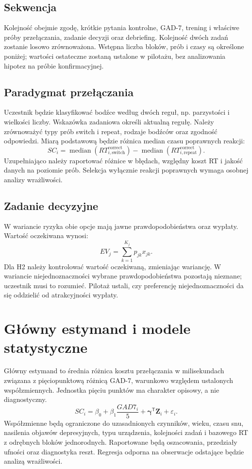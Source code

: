 \documentclass[11pt,a4paper]{article}
\begin{document}
\subsection{Sekwencja}
Kolejność obejmie zgodę, krótkie pytania kontrolne, GAD-7, trening i właściwe próby przełączania, zadanie decyzji oraz debriefing. Kolejność dwóch zadań zostanie losowo zrównoważona. Wstępna liczba bloków, prób i czasy są określone poniżej; wartości ostateczne zostaną ustalone w pilotażu, bez analizowania hipotez na próbie konfirmacyjnej.

\subsection{Paradygmat przełączania}
Uczestnik będzie klasyfikować bodźce według dwóch reguł, np. parzystości i wielkości liczby. Wskazówka zadaniowa określi aktualną regułę. Należy zrównoważyć typy prób switch i repeat, rodzaje bodźców oraz zgodność odpowiedzi. Miarą podstawową będzie różnica median czasu poprawnych reakcji:
\begin{equation}
SC_i=\operatorname{median}(RT^{\mathrm{correct}}_{i,\mathrm{switch}})
-\operatorname{median}(RT^{\mathrm{correct}}_{i,\mathrm{repeat}}).
\end{equation}
Uzupełniająco należy raportować różnice w błędach, względny koszt RT i jakość danych na poziomie prób. Selekcja wyłącznie reakcji poprawnych wymaga osobnej analizy wrażliwości.

\subsection{Zadanie decyzyjne}
W wariancie ryzyka obie opcje mają jawne prawdopodobieństwa oraz wypłaty. Wartość oczekiwana wynosi:
\begin{equation}
EV_j=\sum_{k=1}^{K_j}p_{jk}x_{jk}.
\end{equation}
Dla H2 należy kontrolować wartość oczekiwaną, zmieniając wariancję. W wariancie niejednoznaczności wybrane prawdopodobieństwa pozostają nieznane; uczestnik musi to rozumieć. Pilotaż ustali, czy preferencję niejednoznaczności da się oddzielić od atrakcyjności wypłaty.

\section{Główny estymand i modele statystyczne}
Główny estymand to średnia różnica kosztu przełączania w milisekundach związana z pięciopunktową różnicą GAD-7, warunkowo względem ustalonych współzmiennych. Jednostka pięciu punktów ma charakter opisowy, a nie diagnostyczny.
\begin{equation}
SC_i=\beta_0+\beta_1\frac{GAD7_i}{5}
+\boldsymbol{\gamma}^{\mathsf T}\mathbf Z_i+\varepsilon_i.
\end{equation}
Współzmienne będą ograniczone do uzasadnionych czynników, wieku, czasu snu, nasilenia objawów depresyjnych, typu urządzenia, kolejności zadań i bazowego RT z odrębnych bloków jednorodnych. Raportowane będą oszacowania, przedziały ufności oraz diagnostyka reszt. Regresja odporna na obserwacje odstające będzie analizą wrażliwości.
\end{document}
